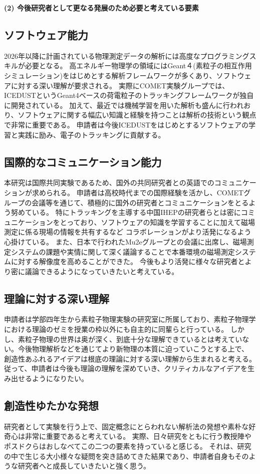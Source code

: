 \documentclass[11pt,a4j,dvipdfmx]{jarticle} 					%
\newcommand{\研究課題名}{COMET Phase-Iに向けたエンジニアリングランおよびその物理解析}
\newcommand{\研究機関名}{大阪大学}
\newcommand{\研究代表者氏名}{高見 翔太   }
\newcommand{\mysubsection}[1]{\vspace{-20pt}\subsection*{\colorbox{cyan!15}{\normalsize{#1}}}\vspace{-0.2cm}}
\begin{document}
	

\vspace{5mm}
\noindent
\textbf{(2) 今後研究者として更なる発展のため必要と考えている要素}
\mysubsection{ソフトウェア能力}
2026年以降に計画されている物理測定データの解析には高度なプログラミングスキルが必要となる。
高エネルギー物理学の領域にはGeant４(素粒子の相互作用シミュレーション)をはじめとする解析フレームワークが多くあり、ソフトウェアに対する深い理解が要求される。
実際にCOMET実験グループでは、ICEDUSTというGeant4ベースの荷電粒子のトラッキングフレームワークが独自に開発されている。
加えて、最近では機械学習を用いた解析も盛んに行われおり、ソフトウェアに関する幅広い知識と経験を持つことは解析の技術という観点で非常に重要である。
申請者は今後ICEDUSTをはじめとするソフトウェアの学習と実践に励み、電子のトラッキングに貢献する。
\mysubsection{国際的なコミュニケーション能力}
本研究は国際共同実験であるため、国外の共同研究者との英語でのコミュニケーションが求められる。
申請者は高校時代までの国際経験を活かし、COMETグループの会議等を通じて、積極的に国外の研究者とコミュニケーションをとるよう努めている。
特にトラッキングを主導する中国IHEPの研究者らとは密にコミュニケーションをとっており、ソフトウェアの知識を学習することに加えて磁場測定に係る現場の情報を共有するなど
コラボレーションがより活発になるよう心掛けている。
また、日本で行われたMu2eグループとの会議に出席し、磁場測定システムの課題や実情に関して深く議論することで本番環境の磁場測定システムに対する解像度を高めることができた。
今後もより活発に様々な研究者とより密に議論できるようになっていきたいと考えている。
\mysubsection{理論に対する深い理解}
申請者は学部四年生から素粒子物理実験の研究室に所属しており、素粒子物理学における理論のゼミを授業の枠以外にも自主的に同輩らと行っている。
しかし、素粒子物理の世界は奥が深く、到底十分な理解できているとは考えていない。今後物理解析などを通じてより新物理の本質に迫っていこうとする上で、
創造性あふれるアイデアは根底の理論に対する深い理解から生まれると考える。
従って、申請者は今後も理論の理解を深めていき、クリティカルなアイデアを生み出せるようになりたい。
\mysubsection{創造性ゆたかな発想}
研究者として実験を行う上で、固定概念にとらわれない解析法の発想や素朴な好奇心は非常に重要であると考えている。
実際、日々研究をともに行う教授陣やポスドクらはおしなべてこの二つの要素を持っていると感じる。
それは、研究の中で生じる大小様々な疑問を突き詰めてきた結果であり、申請者自身もそのような研究者へと成長していきたいと強く思う。




\end{document}
